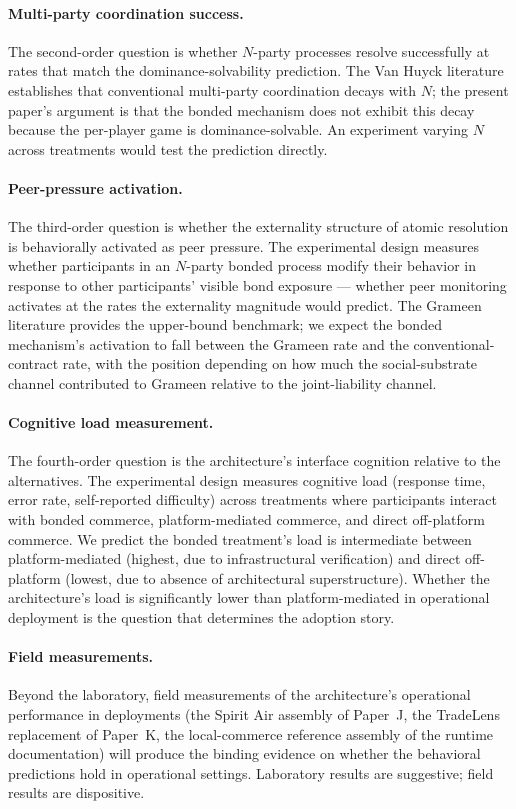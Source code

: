 \documentclass[11pt,a4paper]{article}
\theoremstyle{definition}
\theoremstyle{remark}
\begin{document}
\paragraph{Multi-party coordination success.}
The second-order question is whether $N$-party processes resolve
successfully at rates that match the dominance-solvability
prediction. The Van Huyck literature establishes that conventional
multi-party coordination decays with $N$; the present paper's
argument is that the bonded mechanism does not exhibit this decay
because the per-player game is dominance-solvable. An experiment
varying $N$ across treatments would test the prediction directly.

\paragraph{Peer-pressure activation.}
The third-order question is whether the externality structure of
atomic resolution is behaviorally activated as peer pressure. The
experimental design measures whether participants in an $N$-party
bonded process modify their behavior in response to other
participants' visible bond exposure --- whether peer monitoring
activates at the rates the externality magnitude would predict.
The Grameen literature provides the upper-bound benchmark; we
expect the bonded mechanism's activation to fall between the
Grameen rate and the conventional-contract rate, with the
position depending on how much the social-substrate channel
contributed to Grameen relative to the joint-liability channel.

\paragraph{Cognitive load measurement.}
The fourth-order question is the architecture's interface
cognition relative to the alternatives. The experimental design
measures cognitive load (response time, error rate,
self-reported difficulty) across treatments where participants
interact with bonded commerce, platform-mediated commerce, and
direct off-platform commerce. We predict the bonded treatment's
load is intermediate between platform-mediated (highest, due to
infrastructural verification) and direct off-platform (lowest,
due to absence of architectural superstructure). Whether the
architecture's load is significantly lower than platform-mediated
in operational deployment is the question that determines the
adoption story.

\paragraph{Field measurements.}
Beyond the laboratory, field measurements of the architecture's
operational performance in deployments (the Spirit Air assembly
of Paper~J, the TradeLens replacement of Paper~K, the
local-commerce reference assembly of the runtime documentation)
will produce the binding evidence on whether the behavioral
predictions hold in operational settings. Laboratory results are
suggestive; field results are dispositive.
\end{document}
